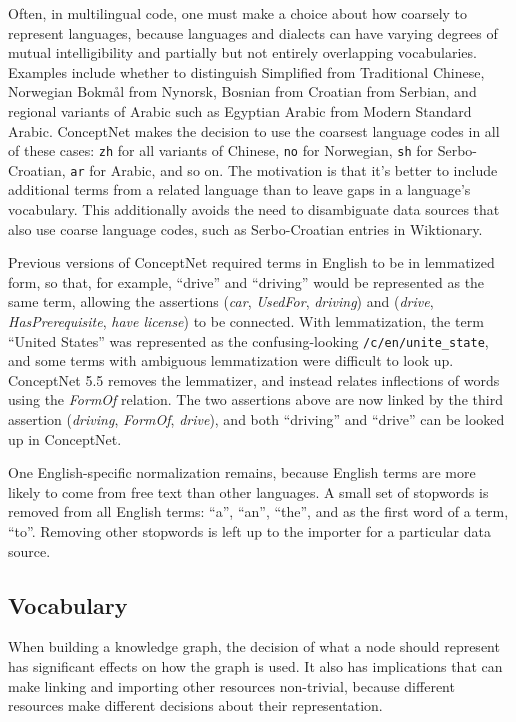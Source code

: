 \documentclass[letterpaper]{article}
\begin{document}
Often, in multilingual code, one must make a choice about how coarsely
to represent languages, because languages and dialects can have varying
degrees of mutual intelligibility and partially but not entirely
overlapping vocabularies. Examples include whether to distinguish
Simplified from Traditional Chinese, Norwegian Bokmål from Nynorsk,
Bosnian from Croatian from Serbian, and regional variants of Arabic such
as Egyptian Arabic from Modern Standard Arabic. ConceptNet makes the
decision to use the coarsest language codes in all of these cases:
\texttt{zh} for all variants of Chinese, \texttt{no} for Norwegian,
\texttt{sh} for Serbo-Croatian, \texttt{ar} for Arabic, and so on. The
motivation is that it's better to include additional terms from a
related language than to leave gaps in a language's vocabulary. This
additionally avoids the need to disambiguate data sources that also use
coarse language codes, such as Serbo-Croatian entries in Wiktionary.

Previous versions of ConceptNet required terms in English to be in
lemmatized form, so that, for example, ``drive'' and ``driving'' would
be represented as the same term, allowing the assertions (\emph{car},
\emph{UsedFor}, \emph{driving}) and (\emph{drive},
\emph{HasPrerequisite}, \emph{have license}) to be connected. With
lemmatization, the term ``United States'' was represented as the
confusing-looking \texttt{/c/en/unite\_state}, and some terms with
ambiguous lemmatization were difficult to look up. ConceptNet 5.5
removes the lemmatizer, and instead relates inflections of words using
the \emph{FormOf} relation. The two assertions above are now linked by
the third assertion (\emph{driving}, \emph{FormOf}, \emph{drive}), and
both ``driving'' and ``drive'' can be looked up in ConceptNet.

One English-specific normalization remains, because English terms are
more likely to come from free text than other languages. A small set of
stopwords is removed from all English terms: ``a'', ``an'', ``the'', and
as the first word of a term, ``to''. Removing other stopwords is left up
to the importer for a particular data source.


\subsection{Vocabulary}\label{vocabulary}

When building a knowledge graph, the decision of what a node should
represent has significant effects on how the graph is used. It also has
implications that can make linking and importing other resources
non-trivial, because different resources make different decisions about
their representation.
\end{document}
